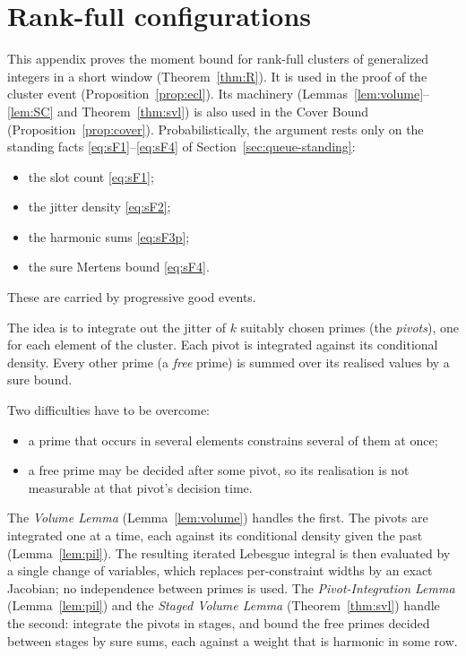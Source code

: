 \section{Rank-full configurations}\label{app:rankfull}

This appendix proves the moment bound for rank-full clusters of generalized integers in a short window
(Theorem~\ref{thm:R}). It is used in the proof of the cluster event (Proposition~\ref{prop:ecl}). Its machinery
(Lemmas~\ref{lem:volume}--\ref{lem:SC} and Theorem~\ref{thm:svl}) is also used in the Cover Bound
(Proposition~\ref{prop:cover}). Probabilistically, the argument rests only on the standing facts
\ref{eq:sF1}--\ref{eq:sF4} of Section~\ref{sec:queue-standing}:
\begin{itemize}
\item the slot count \ref{eq:sF1};
\item the jitter density \ref{eq:sF2};
\item the harmonic sums \ref{eq:sF3p};
\item the sure Mertens bound \ref{eq:sF4}.
\end{itemize}
These are carried by progressive good events.

The idea is to integrate out the jitter of $k$ suitably chosen primes (the \emph{pivots}), one for each element of the
cluster. Each pivot is integrated against its conditional density. Every other prime (a \emph{free} prime) is summed over
its realised values by a sure bound.

Two difficulties have to be overcome:
\begin{itemize}
\item a prime that occurs in several elements constrains several of them at once;
\item a free prime may be decided after some pivot, so its realisation is not measurable at that pivot's decision time.
\end{itemize}
The \emph{Volume Lemma} (Lemma~\ref{lem:volume}) handles the first. The pivots are integrated one at a time, each
against its conditional density given the past (Lemma~\ref{lem:pil}). The resulting iterated Lebesgue integral is then
evaluated by a single change of variables, which replaces per-constraint widths by an exact Jacobian; no independence
between primes is used.
The \emph{Pivot-Integration Lemma} (Lemma~\ref{lem:pil})
and the \emph{Staged Volume Lemma} (Theorem~\ref{thm:svl}) handle the second: integrate the pivots in stages, and bound
the free primes decided between stages by sure sums, each against a weight that is harmonic in some row.

